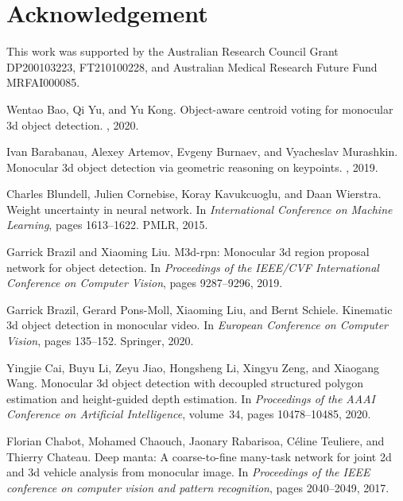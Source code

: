 \documentclass[10pt,twocolumn,letterpaper]{article}
\begin{document}
\section{Acknowledgement}
This work was supported by the Australian Research Council Grant DP200103223, FT210100228, and Australian Medical Research Future Fund MRFAI000085. {\small
\begin{thebibliography}{10}\itemsep=-1pt

Wentao Bao, Qi Yu, and Yu Kong.
\newblock Object-aware centroid voting for monocular 3d object detection.
, 2020.

Ivan Barabanau, Alexey Artemov, Evgeny Burnaev, and Vyacheslav Murashkin.
\newblock Monocular 3d object detection via geometric reasoning on keypoints.
, 2019.

Charles Blundell, Julien Cornebise, Koray Kavukcuoglu, and Daan Wierstra.
\newblock Weight uncertainty in neural network.
\newblock In {\em International Conference on Machine Learning}, pages
  1613--1622. PMLR, 2015.

Garrick Brazil and Xiaoming Liu.
\newblock M3d-rpn: Monocular 3d region proposal network for object detection.
\newblock In {\em Proceedings of the IEEE/CVF International Conference on
  Computer Vision}, pages 9287--9296, 2019.

Garrick Brazil, Gerard Pons-Moll, Xiaoming Liu, and Bernt Schiele.
\newblock Kinematic 3d object detection in monocular video.
\newblock In {\em European Conference on Computer Vision}, pages 135--152.
  Springer, 2020.

Yingjie Cai, Buyu Li, Zeyu Jiao, Hongsheng Li, Xingyu Zeng, and Xiaogang Wang.
\newblock Monocular 3d object detection with decoupled structured polygon
  estimation and height-guided depth estimation.
\newblock In {\em Proceedings of the AAAI Conference on Artificial
  Intelligence}, volume~34, pages 10478--10485, 2020.

Florian Chabot, Mohamed Chaouch, Jaonary Rabarisoa, C{\'e}line Teuliere, and
  Thierry Chateau.
\newblock Deep manta: A coarse-to-fine many-task network for joint 2d and 3d
  vehicle analysis from monocular image.
\newblock In {\em Proceedings of the IEEE conference on computer vision and
  pattern recognition}, pages 2040--2049, 2017.


\end{thebibliography}}
\end{document}
